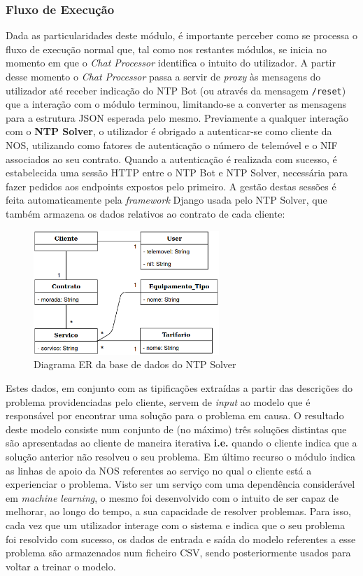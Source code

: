 \documentclass[11pt,a4paper]{article}
\begin{document}
\subsubsection{Fluxo de Execução}
Dada as particularidades deste módulo, é importante perceber como se processa o fluxo de execução normal
que, tal como nos restantes módulos, se inicia no momento em que o \textit{Chat Processor} identifica o intuito do
utilizador. A partir desse momento o \textit{Chat Processor} passa a servir de \textit{proxy} às mensagens do
utilizador até receber indicação do NTP Bot (ou através da mensagem \texttt{/reset}) que a interação com o
módulo terminou, limitando-se a converter as mensagens para a estrutura JSON esperada pelo
mesmo. Previamente a qualquer interação com o \textbf{NTP Solver}, o utilizador é obrigado a autenticar-se
como cliente da NOS, utilizando como fatores de autenticação o número de telemóvel e o NIF associados ao seu
contrato. Quando a autenticação é realizada com sucesso, é estabelecida uma sessão HTTP entre o NTP Bot e
NTP Solver, necessária para fazer pedidos aos endpoints expostos pelo primeiro. A gestão destas sessões é
feita automaticamente pela \textit{framework} Django usada pelo NTP Solver, que também armazena os dados
relativos ao contrato de cada cliente:

\begin{figure}[H]
    \centering
    \includegraphics[width=7cm]{images/NTP_Solver_DB.png}
    \caption{Diagrama ER da base de dados do NTP Solver}
    \label{fig:ntp_er_diagram}
\end{figure}

Estes dados, em conjunto com as tipificações extraídas a partir das descrições do problema providenciadas
pelo cliente, servem de \textit{input} ao modelo que é responsável por encontrar uma solução para o problema
em causa. O resultado deste modelo consiste num conjunto de (no máximo) três soluções distintas que são
apresentadas ao cliente de maneira iterativa \textbf{i.e.} quando o cliente indica que a solução anterior
não resolveu o seu problema. Em último recurso o módulo indica as linhas de apoio da NOS referentes ao
serviço no qual o cliente está a experienciar o problema. Visto ser um serviço com uma dependência
considerável em \textit{machine learning}, o mesmo foi desenvolvido com o intuito de ser capaz de melhorar,
ao longo do tempo, a sua capacidade de resolver problemas. Para isso, cada vez que um utilizador interage
com o sistema e indica que o seu problema foi resolvido com sucesso, os dados de entrada e saída do modelo
referentes a esse problema são armazenados num ficheiro CSV, sendo posteriormente usados para voltar a treinar o modelo.
\newline
\end{document}
